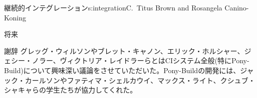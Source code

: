 \begin{aosachapter}{継続的インテグレーション}{s:integration}{C.\ Titus Brown and Rosangela Canino-Koning}
\begin{aosasect1}{将来}
\begin{aosasect2}{謝辞}
グレッグ・ウィルソンやブレット・キャノン、エリック・ホルシャー、ジェシー・ノラー、ヴィクトリア・レイドラーらとはCIシステム全般(特にPony-Build)について興味深い議論をさせていただいた。Pony-Buildの開発には、ジャック・カールソンやファティマ・シェルカウイ、マックス・ライト、クシュブ・シャキャらの学生たちが協力してくれた。

\end{aosasect2}

\end{aosasect1}

\end{aosachapter}
